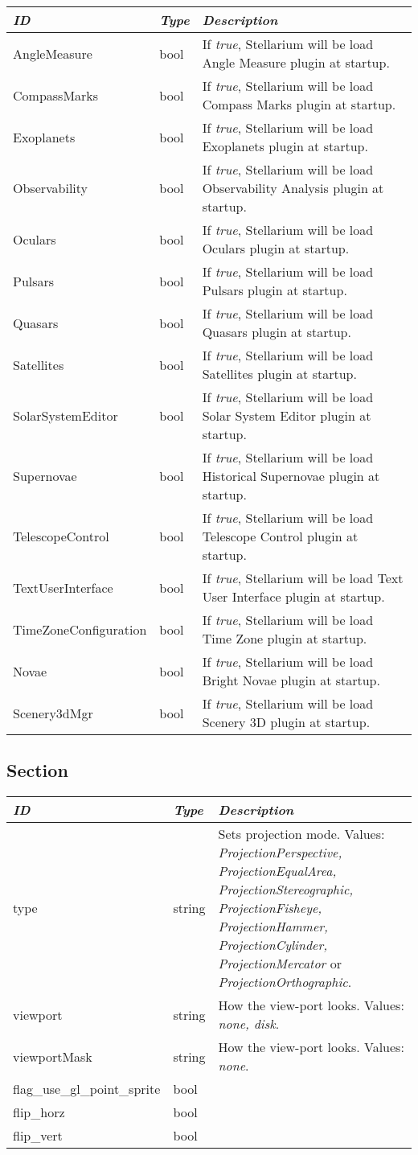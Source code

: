 \begin{longtabu} to \textwidth {l|l|X}
\toprule
\emph{ID} & \emph{Type} & \emph{Description}\tabularnewline
\midrule
AngleMeasure & bool & If \emph{true}, Stellarium will be load
Angle Measure plugin at startup.\tabularnewline
\midrule
CompassMarks & bool & If \emph{true}, Stellarium will be load
Compass Marks plugin at startup.\tabularnewline
\midrule
Exoplanets & bool & If \emph{true}, Stellarium will be load
Exoplanets plugin at startup.\tabularnewline
\midrule
Observability & bool & If \emph{true}, Stellarium will be load
Observability Analysis plugin at startup.\tabularnewline
\midrule
Oculars & bool & If \emph{true}, Stellarium will be load
Oculars plugin at startup.\tabularnewline
\midrule
Pulsars & bool & If \emph{true}, Stellarium will be load
Pulsars plugin at startup.\tabularnewline
\midrule
Quasars & bool & If \emph{true}, Stellarium will be load
Quasars plugin at startup.\tabularnewline
\midrule
Satellites & bool & If \emph{true}, Stellarium will be load
Satellites plugin at startup.\tabularnewline
\midrule
SolarSystemEditor & bool & If \emph{true}, Stellarium will be
load Solar System Editor plugin at startup.\tabularnewline
\midrule
Supernovae & bool & If \emph{true}, Stellarium will be load
Historical Supernovae plugin at startup.\tabularnewline
\midrule
TelescopeControl & bool & If \emph{true}, Stellarium will be
load Telescope Control plugin at startup.\tabularnewline
\midrule
TextUserInterface & bool & If \emph{true}, Stellarium will be
load Text User Interface plugin at startup.\tabularnewline
\midrule
TimeZoneConfiguration & bool & If \emph{true}, Stellarium will
be load Time Zone plugin at startup.\tabularnewline
\midrule
Novae & bool & If \emph{true}, Stellarium will be load Bright
Novae plugin at startup.\tabularnewline
\midrule
Scenery3dMgr & bool & If \emph{true}, Stellarium will be load
Scenery 3D plugin at startup.\tabularnewline
\bottomrule
\end{longtabu}

\subsection{Section }\label{section-projection}

\begin{longtabu} to \textwidth {l|l|X}
\toprule
\emph{ID} & \emph{Type} & \emph{Description}\tabularnewline
\midrule
type & string & Sets projection mode. Values: \emph{ProjectionPerspective,
ProjectionEqualArea, ProjectionStereographic, ProjectionFisheye,
ProjectionHammer, ProjectionCylinder, ProjectionMercator} or
\emph{ProjectionOrthographic}.\tabularnewline
\midrule
viewport & string & How the view-port looks. Values:
\emph{none, disk}.\tabularnewline
\midrule
viewportMask & string & How the view-port looks. Values:
\emph{none}.\tabularnewline
\midrule
flag\_use\_gl\_point\_sprite & bool & \tabularnewline
\midrule
flip\_horz & bool & \tabularnewline
\midrule
flip\_vert & bool & \tabularnewline
\bottomrule
\end{longtabu}


